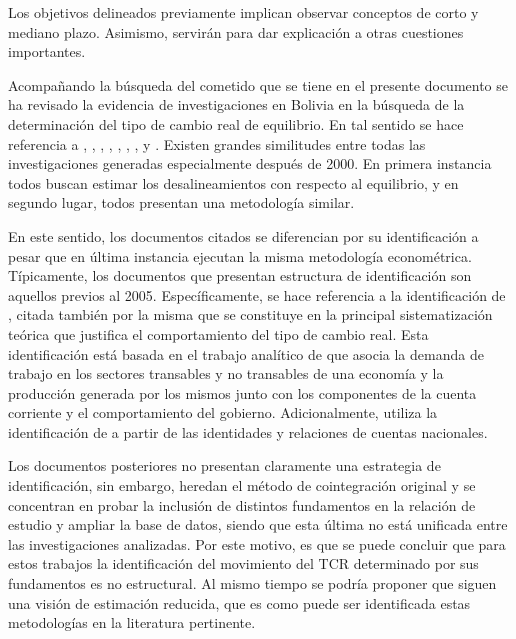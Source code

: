\documentclass[12pt,letterpaper]{article}
\begin{document}
Los objetivos delineados previamente implican observar conceptos de corto y mediano plazo. Asimismo, servirán para dar explicación a otras cuestiones importantes.


Acompañando la búsqueda del cometido que se tiene en el presente documento se ha revisado la evidencia de investigaciones en Bolivia en la búsqueda de la determinación del tipo de cambio real de equilibrio. En tal sentido se hace referencia a \cite{ferrufino1992tipo}, \cite{aguilar2003estimacion}, \cite{humerez2005reexaminando}, \cite{montiel2007equilibrium}, \cite{cerutti2008}, \cite{mendieta2008equilibrio}, \cite{bello2010tipo}, \cite{cerezo2010desempeno} y \cite{cerezo2011tipo}. Existen grandes similitudes entre todas las investigaciones generadas especialmente después de 2000. En primera instancia todos buscan estimar los desalineamientos con respecto al equilibrio, y en segundo lugar, todos presentan una metodología similar.

En este sentido, los documentos citados se diferencian por su identificación a pesar que en última instancia ejecutan la misma metodología econométrica. Típicamente, los documentos que presentan estructura de identificación son aquellos previos al 2005. Específicamente, se hace referencia a la identificación de \cite{lora2000tipo}, citada también por \cite{aguilar2003estimacion} la misma que se constituye en la principal sistematización teórica que justifica el comportamiento del tipo de cambio real. Esta identificación está basada en el trabajo analítico de \cite{hinkle1999exchange} que asocia la demanda de trabajo en los sectores transables y no transables de una economía y la producción generada por los mismos junto con los componentes de la cuenta corriente y el comportamiento del gobierno. Adicionalmente, \cite{humerez2005reexaminando} utiliza la identificación de \cite{elbadawi1994estimating} a partir de las identidades y relaciones de cuentas nacionales. 

Los documentos posteriores no presentan claramente una estrategia de identificación, sin embargo, heredan el método de cointegración original y se concentran en probar la inclusión de distintos fundamentos en la relación de estudio y ampliar la base de datos, siendo que esta última no está unificada entre las investigaciones analizadas. Por este motivo, es que se puede concluir que para estos trabajos la identificación del movimiento del TCR determinado por sus fundamentos es no estructural. Al mismo tiempo se podría proponer que siguen una visión de estimación reducida, que es como puede ser identificada estas metodologías en la literatura pertinente.
\end{document}
